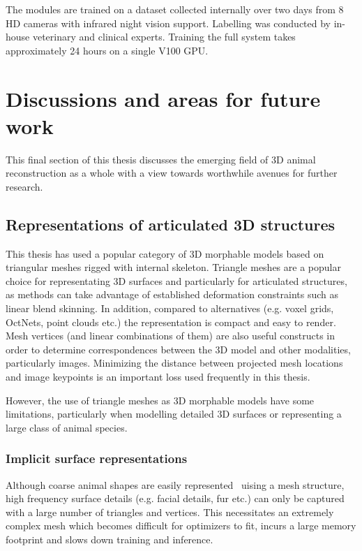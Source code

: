 The modules are trained on a dataset collected internally over two days from 8 HD cameras with infrared night vision support. Labelling was conducted by in-house veterinary and clinical experts. Training the full system takes approximately 24 hours on a single V100 GPU.




\section{Discussions and areas for future work}

This final section of this thesis discusses the emerging field of 3D animal reconstruction as a whole with a view towards worthwhile avenues for further research.

\subsection{Representations of articulated 3D structures}

This thesis has used a popular category of 3D morphable models based on triangular meshes rigged with internal skeleton. Triangle meshes are a popular choice for representating 3D surfaces and particularly for articulated structures, as methods can take advantage of established deformation constraints such as linear blend skinning. In addition, compared to alternatives (e.g. voxel grids, OctNets, point clouds etc.) the representation is compact and easy to render. Mesh vertices (and linear combinations of them) are also useful constructs in order to determine correspondences between the 3D model and other modalities, particularly images. Minimizing the distance between projected mesh locations and image keypoints is an important loss used frequently in this thesis. 

However, the use of triangle meshes as 3D morphable models have some limitations, particularly when modelling detailed 3D surfaces or representing a large class of animal species.

\subsubsection{Implicit surface representations}

Although coarse animal shapes are easily represented~\cite{} uising a mesh structure, high frequency surface details (e.g. facial details, fur etc.) can only be captured with a large number of triangles and vertices. This necessitates an extremely complex mesh which becomes difficult for optimizers to fit, incurs a large memory footprint and slows down training and inference.

